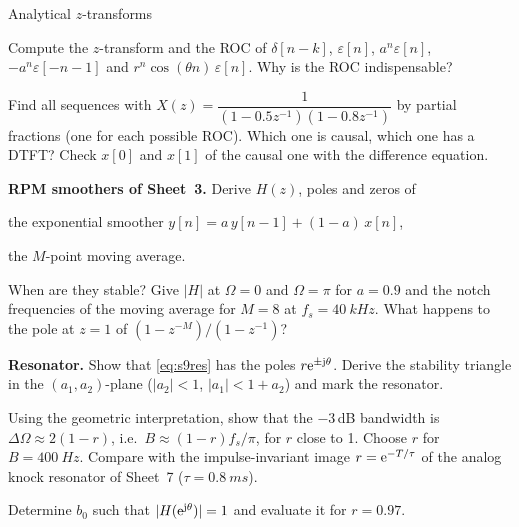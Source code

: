 \begin{exercise}{Analytical $z$-transforms}{\Paper}
\begin{tasks}
  \item Compute the $z$-transform and the ROC of $\delta[n-k]$, $\varepsilon[n]$,
    $a^n\varepsilon[n]$, $-a^n\varepsilon[-n-1]$ and
    $r^n\cos(\theta n)\,\varepsilon[n]$. Why is the ROC indispensable?
  \item Find all sequences with
    $X(z)=\dfrac{1}{(1-0.5z^{-1})(1-0.8z^{-1})}$ by partial fractions (one for
    each possible ROC). Which one is causal, which one has a DTFT? Check
    $x[0]$ and $x[1]$ of the causal one with the difference equation.
  \item \textbf{RPM smoothers of Sheet~3.} Derive $H(z)$, poles and zeros of
    \begin{tasks}
      \item the exponential smoother $y[n]=a\,y[n-1]+(1-a)\,x[n]$,
      \item the $M$-point moving average.
    \end{tasks}
    When are they stable? Give $|H|$ at $\Omega=0$ and $\Omega=\pi$ for $a=0.9$
    and the notch frequencies of the moving average for $M=8$ at
    $f_s=\SI{40}{kHz}$. What happens to the pole at $z=1$ of
    $(1-z^{-M})/(1-z^{-1})$?
  \item \textbf{Resonator.} Show that \eqref{eq:s9res} has the poles
    $r\mathrm{e}^{\pm\mathrm{j}\theta}$. Derive the stability triangle in the
    $(a_1,a_2)$-plane ($|a_2|<1$, $|a_1|<1+a_2$) and mark the resonator.
  \item Using the geometric interpretation, show that the $-3$\,dB bandwidth is
    $\Delta\Omega\approx2(1-r)$, i.e.\ $B\approx(1-r)f_s/\pi$, for $r$ close to 1.
    Choose $r$ for $B=\SI{400}{Hz}$. Compare with the impulse-invariant image
    $r=\mathrm{e}^{-T/\tau}$ of the analog knock resonator of Sheet~7
    ($\tau=\SI{0.8}{ms}$).
  \item Determine $b_0$ such that $|H(\mathrm{e}^{\mathrm{j}\theta})|=1$ and evaluate it for
    $r=0.97$.
\end{tasks}
\end{exercise}

